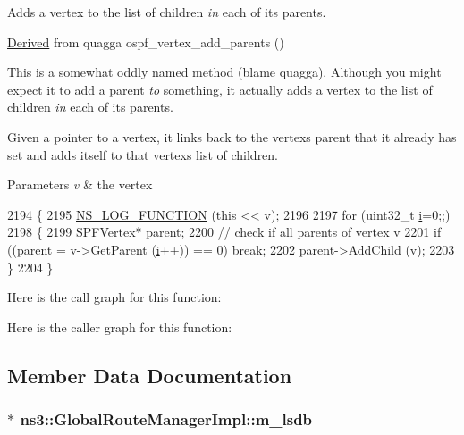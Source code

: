 Adds a vertex to the list of children {\itshape in} each of its parents. 

\hyperlink{classDerived}{Derived} from quagga ospf\+\_\+vertex\+\_\+add\+\_\+parents ()

This is a somewhat oddly named method (blame quagga). Although you might expect it to add a parent {\itshape to} something, it actually adds a vertex to the list of children {\itshape in} each of its parents.

Given a pointer to a vertex, it links back to the vertex\textquotesingle{}s parent that it already has set and adds itself to that vertex\textquotesingle{}s list of children.


\begin{DoxyParams}{Parameters}
{\em v} & the vertex \\
\hline
\end{DoxyParams}

\begin{DoxyCode}
2194 \{
2195   \hyperlink{log-macros-disabled_8h_a90b90d5bad1f39cb1b64923ea94c0761}{NS\_LOG\_FUNCTION} (\textcolor{keyword}{this} << v);
2196 
2197   \textcolor{keywordflow}{for} (uint32\_t \hyperlink{bernuolliDistribution_8m_a6f6ccfcf58b31cb6412107d9d5281426}{i}=0;;)
2198     \{
2199       SPFVertex* parent;
2200       \textcolor{comment}{// check if all parents of vertex v}
2201       \textcolor{keywordflow}{if} ((parent = v->GetParent (\hyperlink{bernuolliDistribution_8m_a6f6ccfcf58b31cb6412107d9d5281426}{i}++)) == 0) \textcolor{keywordflow}{break};
2202       parent->AddChild (v);
2203     \}
2204 \}
\end{DoxyCode}


Here is the call graph for this function\+:




Here is the caller graph for this function\+:




\subsection{Member Data Documentation}
\subsubsection[{\texorpdfstring{m\+\_\+lsdb}{m_lsdb}}]{$\ast$ ns3\+::\+Global\+Route\+Manager\+Impl\+::m\+\_\+lsdb\hspace{0.3cm}{\ttfamily [private]}}\hypertarget{classns3_1_1GlobalRouteManagerImpl_a7e528f818fa3e6c794b07c0b3cba5f61}{}\label{classns3_1_1GlobalRouteManagerImpl_a7e528f818fa3e6c794b07c0b3cba5f61}


